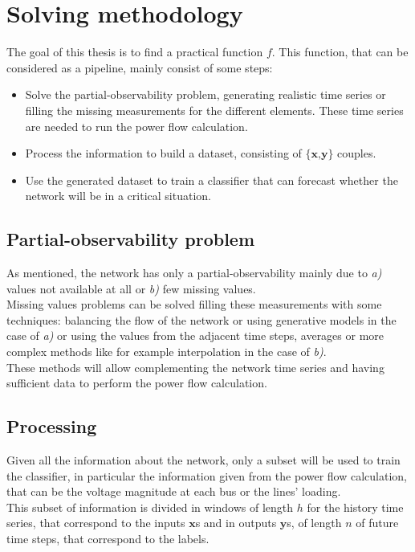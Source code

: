 \section{Solving methodology}
\label{sec:sm}
The goal of this thesis is to find a practical function $f$. This function, that can be considered as a pipeline, mainly consist of some steps:
\begin{itemize}
    \item Solve the partial-observability problem, generating realistic time series or filling the missing measurements for the different elements. These time series are needed to run the power flow calculation.
    \item Process the information to build a dataset, consisting of $\{\textbf{x,y}\}$ couples.
    \item Use the generated dataset to train a classifier that can forecast whether the network will be in a critical situation.
\end{itemize}

\subsection{Partial-observability problem}
As mentioned, the network has only a partial-observability mainly due to \emph{a)} values not available at all or \emph{b)} few missing values. \\

Missing values problems can be solved filling these measurements with some techniques: balancing the flow of the network or using generative models in the case of \emph{a)} or using the values from the adjacent time steps, averages or more complex methods like for example interpolation in the case of \emph{b)}. \\

These methods will allow complementing the network time series and having sufficient data to perform the power flow calculation.

\subsection{Processing}
Given all the information about the network, only a subset will be used to train the classifier, in particular the information given from the power flow calculation, that can be the voltage magnitude at each bus or the lines' loading. \\

This subset of information is divided in windows of length $h$ for the history time series, that correspond to the inputs $\textbf{x}$s and in outputs $\textbf{y}$s, of length $n$ of future time steps, that correspond to the labels.

